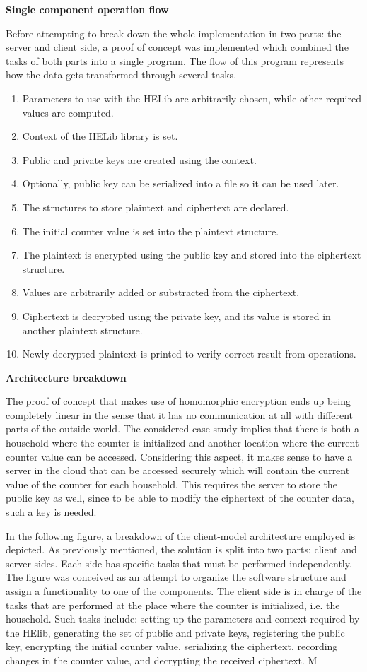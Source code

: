 \textbf{Single component operation flow}

Before attempting to break down the whole implementation in two parts: the server and client side, a proof of concept was implemented which combined the tasks of both parts into a single program. The flow of this program represents how the data gets transformed through several tasks. 

\begin{enumerate}
	\item Parameters to use with the HELib are arbitrarily chosen, while other required values are computed.
	\item Context of the HELib library is set.	
	\item Public and private keys are created using the context.
	\item Optionally, public key can be serialized into a file so it can be used later.
	\item The structures to store plaintext and ciphertext are declared.
	\item The initial counter value is set into the plaintext structure.
	\item The plaintext is encrypted using the public key and stored into the ciphertext structure.
	\item Values are arbitrarily added or substracted from the ciphertext.
	\item Ciphertext is decrypted using the private key, and its value is stored in another plaintext structure.
	\item Newly decrypted plaintext is printed to verify correct result from operations.
\end{enumerate}

\textbf{Architecture breakdown}

The proof of concept that makes use of homomorphic encryption ends up being completely linear in the sense that it has no communication at all with different parts of the outside world. The considered case study implies that there is both a household where the counter is initialized and another location where the current counter value can be accessed. Considering this aspect, it makes sense to have a server in the cloud that can be accessed securely which will contain the current value of the counter for each household. This requires the server to store the public key as well, since to be able to modify the ciphertext of the counter data, such a key is needed. 

In the following figure, a breakdown of the client-model architecture employed is depicted. As previously mentioned, the solution is split into two parts: client and server sides. Each side has specific tasks that must be performed independently. The figure was conceived as an attempt to organize the software structure and assign a functionality to one of the components. The client side is in charge of the tasks that are performed at the place where the counter is initialized, i.e. the household. Such tasks include: setting up the parameters and context required by the HElib, generating the set of public and private keys, registering the public key, encrypting the initial counter value, serializing the ciphertext, recording changes in the counter value, and decrypting the received ciphertext. M 

